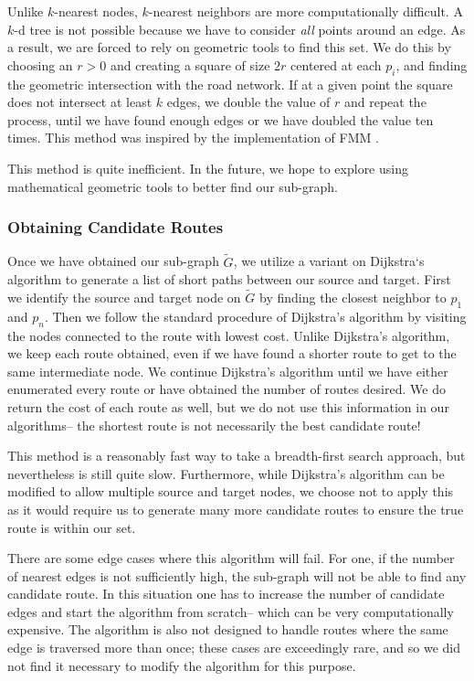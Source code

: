 \documentclass{article}
\numberwithin{equation}{section}
\theoremstyle{definition}
\begin{document}
Unlike $k$-nearest nodes, $k$-nearest neighbors are more computationally difficult. A $k$-d tree is not possible because we have to consider \textit{all} points around an edge. As a result, we are forced to rely on geometric tools to find this set. We do this by choosing an $r>0$ and creating a square of size $2r$ centered at each $p_i$, and finding the geometric intersection with the road network. If at a given point the square does not intersect at least $k$ edges, we double the value of $r$ and repeat the process, until we have found enough edges or we have doubled the value ten times. This method was inspired by the implementation of FMM \cite{YG}.

This method is quite inefficient. In the future, we hope to explore using mathematical geometric tools to better find our sub-graph.

\subsubsection{Obtaining Candidate Routes}
\label{ssub:obtaining-candidate-routes}

Once we have obtained our sub-graph $\tilde{G}$, we utilize a variant on Dijkstra`s algorithm to generate a list of short paths between our source and target. First we identify the source and target node on $\tilde{G}$ by finding the closest neighbor to $p_1$ and $p_n$. Then we follow the standard procedure of Dijkstra's algorithm by visiting the nodes connected to the route with lowest cost. Unlike Dijkstra's algorithm, we keep each route obtained, even if we have found a shorter route to get to the same intermediate node. We continue Dijkstra's algorithm until we have either enumerated every route or have obtained the number of routes desired. We do return the cost of each route as well, but we do not use this information in our algorithms-- the shortest route is not necessarily the best candidate route!

This method is a reasonably fast way to take a breadth-first search approach, but nevertheless is still quite slow. Furthermore, while Dijkstra's algorithm can be modified to allow multiple source and target nodes, we choose not to apply this as it would require us to generate many more candidate routes to ensure the true route is within our set.

There are some edge cases where this algorithm will fail. For one, if the number of nearest edges is not sufficiently high, the sub-graph will not be able to find any candidate route. In this situation one has to increase the number of candidate edges and start the algorithm from scratch-- which can be very computationally expensive. The algorithm is also not designed to handle routes where the same edge is traversed more than once; these cases are exceedingly rare, and so we did not find it necessary to modify the algorithm for this purpose.
\end{document}
